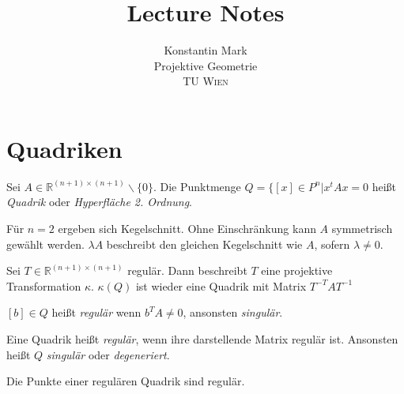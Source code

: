 \documentclass[11pt]{article}
\title{Lecture Notes}
\author{Konstantin Mark\\
Projektive Geometrie\\ 
\textsc{TU Wien}
}
\begin{document}
\maketitle

\section{Quadriken}


\begin{definition}
    Sei $A\in \mathbb R^{(n+1)\times(n+1)}\backslash\{0\}$. Die Punktmenge $Q= \{[x]\in P^n|x^tAx = 0$ heißt \textit{Quadrik} oder \textit{Hyperfläche 2. Ordnung}.
\end{definition}

\begin{remark}
    Für $n=2$ ergeben sich Kegelschnitt. Ohne Einschränkung kann $A$ symmetrisch gewählt werden. $\lambda A$ beschreibt den gleichen Kegelschnitt wie $A$, sofern $\lambda \neq 0$. 
\end{remark}

\begin{remark}
    Sei $T\in \mathbb R^{(n+1)\times(n+1)}$ regulär. Dann beschreibt $T$ eine projektive Transformation $\kappa$. $\kappa(Q)$ ist wieder eine Quadrik mit Matrix $T^{-T}AT^{-1}$
\end{remark}

\begin{definition}
    $[b]\in Q$ heißt \textit{regulär} wenn $b^TA\neq 0$, ansonsten \textit{singulär}.
\end{definition}

\begin{definition}
    Eine Quadrik heißt \textit{regulär}, wenn ihre darstellende Matrix regulär ist. Ansonsten heißt $Q$ \textit{singulär} oder \textit{degeneriert}. 
\end{definition}

\begin{remark}
    Die Punkte einer regulären Quadrik sind regulär.
\end{remark}
\end{document}
